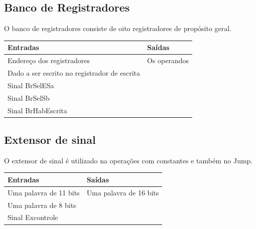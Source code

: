 \documentclass{article}
\begin{document}
 \subsection{Banco de Registradores}
    O banco de registradores consiste de oito registradores de propósito geral.
  \FloatBarrier
    \begin{table}[H]
      \begin{center}
        \begin{tabular}[pos]{|m{7cm} | m{7cm}|} 
          \hline
          \cellcolor[gray]{0.9}\textbf{Entradas} & \cellcolor[gray]{0.9}\textbf{Saídas} \\ \hline
            Endereço dos registradores & Os operandos\\ \hline
            Dado a ser escrito no registrador de escrita & \\ \hline
            Sinal BrSelESa & \\ \hline
            Sinal BrSelSb & \\ \hline
            Sinal BrHabEscrita & \\ \hline
        \end{tabular}
      \end{center}
    \end{table}  
    
 \subsection{Extensor de sinal}
    O extensor de sinal é utilizado na operações com constantes e também no Jump. 
  \FloatBarrier
    \begin{table}[H]
      \begin{center}
        \begin{tabular}[pos]{|m{7cm} | m{7cm}|} 
          \hline
          \cellcolor[gray]{0.9}\textbf{Entradas} & \cellcolor[gray]{0.9}\textbf{Saídas} \\ \hline
            Uma palavra de 11 bits & Uma palavra de 16 bits \\ \hline
            Uma palavra de 8 bits & \\ \hline
            Sinal Excontrole & \\ \hline
        \end{tabular}
      \end{center}
    \end{table}  
    
\end{document}
